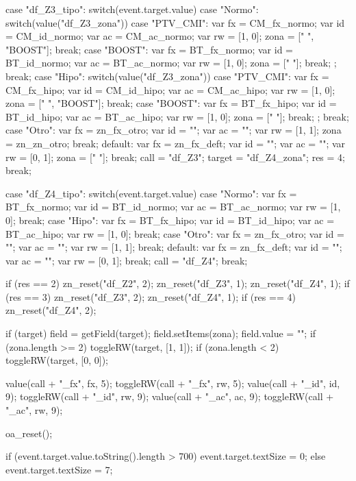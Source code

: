 {			case "df_Z3_tipo":  
				switch(event.target.value){
					case "Normo": 
						switch(value("df_Z3_zona")){
							case "PTV_CMI": var fx = CM_fx_normo; var id = CM_id_normo; var ac = CM_ac_normo; var rw = [1, 0]; zona = [" ", "BOOST"];            break;
							case "BOOST":   var fx = BT_fx_normo; var id = BT_id_normo; var ac = BT_ac_normo; var rw = [1, 0]; zona = [" "];                     break;
						}; break;				
					case "Hipo":  
						switch(value("df_Z3_zona")){
							case "PTV_CMI": var fx = CM_fx_hipo; var id = CM_id_hipo;  var ac = CM_ac_hipo;  var rw = [1, 0]; zona = [" ", "BOOST"];            break;
							case "BOOST":   var fx = BT_fx_hipo; var id = BT_id_hipo;  var ac = BT_ac_hipo;  var rw = [1, 0]; zona = [" "];                     break;
						}; break;
					case "Otro":        var fx = zn_fx_otro; var id = "";          var ac = "";          var rw = [1, 1]; zona = zn_zn_otro;                break;
					default:            var fx = zn_fx_deft; var id = "";          var ac = "";          var rw = [0, 1]; zona = [" "];                     break;
				}
				call = "df_Z3"; target = "df_Z4_zona"; res = 4; break;

			case "df_Z4_tipo":  
				switch(event.target.value){
					case "Normo":      var fx = BT_fx_normo;    var id = BT_id_normo; var ac = BT_ac_normo; var rw = [1, 0]; break;
					case "Hipo":       var fx = BT_fx_hipo;     var id = BT_id_hipo;  var ac = BT_ac_hipo;  var rw = [1, 0]; break;
					case "Otro":       var fx = zn_fx_otro;     var id = "";          var ac = "";          var rw = [1, 1]; break;
					default:           var fx = zn_fx_deft;     var id = "";          var ac = "";          var rw = [0, 1]; break;
				}
				call = "df_Z4"; break;
		}

		if (res == 2){ zn_reset("df_Z2", 2); zn_reset("df_Z3", 1); zn_reset("df_Z4", 1);}
		if (res == 3){ zn_reset("df_Z3", 2); zn_reset("df_Z4", 1);} 
		if (res == 4){ zn_reset("df_Z4", 2);}

		if (target) {
			field = getField(target); field.setItems(zona); field.value = "";
			if (zona.length >= 2) {toggleRW(target, [1, 1]);}
			if (zona.length < 2)  {toggleRW(target, [0, 0]);}
		}

		value(call + "_fx", fx, 5); toggleRW(call + "_fx", rw, 5);
		value(call + "_id", id, 9); toggleRW(call + "_id", rw, 9);
		value(call + "_ac", ac, 9); toggleRW(call + "_ac", rw, 9);

		oa_reset();

	\stopJScode


		if (event.target.value.toString().length > 700) {
			event.target.textSize = 0;
		} else {
			event.target.textSize = 7;
		}
	\stopJScode

